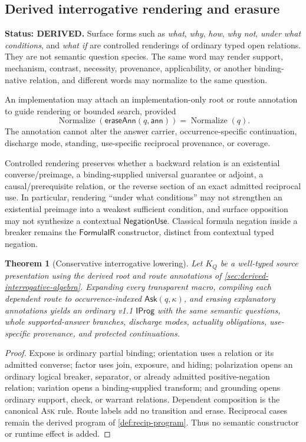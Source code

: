 \documentclass[11pt,oneside]{article}
\newtheorem{theorem}[definition]{Theorem}
\newcommand{\Normalize}{\operatorname{Normalize}}
\begin{document}
\subsection{Derived interrogative rendering and erasure}

\textbf{Status: DERIVED.}  Surface forms such as \emph{what}, \emph{why}, \emph{how},
\emph{why not}, \emph{under what conditions}, and \emph{what if} are controlled renderings of
ordinary typed open relations.  They are not semantic question species.  The same word may render
support, mechanism, contrast, necessity, provenance, applicability, or another binding-native
relation, and different words may normalize to the same question.

An implementation may attach an implementation-only root or route annotation to guide rendering
or bounded search, provided
\[
\boxed{
\Normalize(\mathsf{eraseAnn}(q,\mathsf{ann}))=\Normalize(q).
}
\]
The annotation cannot alter the answer carrier, occurrence-specific continuation, discharge mode,
standing, use-specific reciprocal provenance, or coverage.

Controlled rendering preserves whether a backward relation is an existential converse/preimage, a
binding-supplied universal guarantee or adjoint, a causal/prerequisite relation, or the reverse
section of an exact admitted reciprocal use.  In particular, rendering ``under what conditions''
may not strengthen an existential preimage into a weakest sufficient condition, and surface
opposition may not synthesize a contextual \(\mathsf{NegationUse}\).  Classical formula negation
inside a breaker remains the \(\mathsf{FormulaIR}\) constructor, distinct from contextual typed
negation.

\begin{theorem}[Conservative interrogative lowering]\label{thm:interrogative-lowering}
Let \(K_Q\) be a well-typed source presentation using the derived root and route annotations of
\cref{sec:derived-interrogative-algebra}.  Expanding every transparent macro, compiling each
dependent route to occurrence-indexed \(\mathsf{Ask}(q,\kappa)\), and erasing explanatory
annotations yields an ordinary v1.1 \(\mathsf{IProg}\) with the same semantic questions, whole
supported-answer branches, discharge modes, actuality obligations, use-specific provenance, and
protected continuations.
\end{theorem}

\begin{proof}
Expose is ordinary partial binding; orientation uses a relation or its admitted converse; factor
uses join, exposure, and hiding; polarization opens an ordinary logical breaker, separator, or
already admitted positive-negation relation; variation opens a binding-supplied transform; and
grounding opens ordinary support, check, or warrant relations.  Dependent composition is the
canonical \textsc{Ask} rule.  Route labels add no transition and erase.  Reciprocal cases remain the
derived program of \cref{def:recip-program}.  Thus no semantic constructor or runtime effect is
added.
\end{proof}
\end{document}
